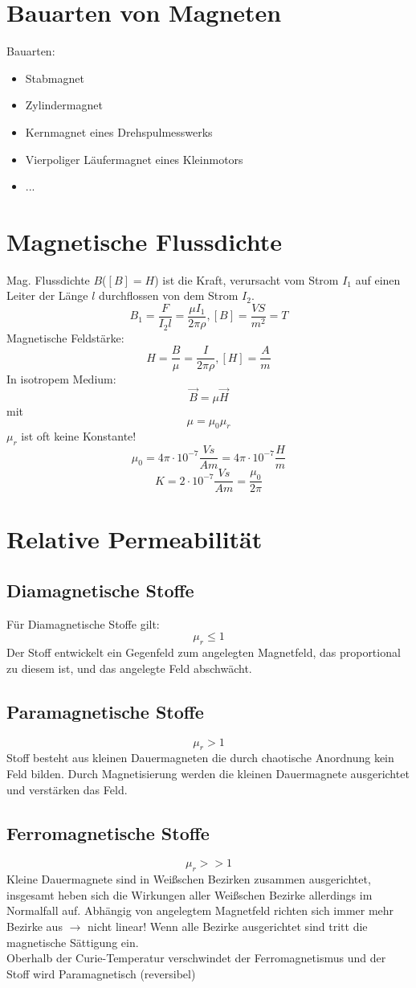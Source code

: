 \documentclass[12pt,a4paper]{article}
\begin{document}
\section{Bauarten von Magneten}
Bauarten:
\begin{itemize}
\item
Stabmagnet
\item
Zylindermagnet
\item
Kernmagnet eines Drehspulmesswerks
\item
Vierpoliger Läufermagnet eines Kleinmotors
\item
...
\end{itemize}


\section{Magnetische Flussdichte}
Mag. Flussdichte $B$($[B] = H$) ist die Kraft, verursacht vom Strom $I_1$ auf einen Leiter der Länge $l$ durchflossen von dem Strom $I_2$.
\[B_1 = \frac{F}{I_2 l} = \frac{\mu I_1}{2\pi \rho}, [B] = \frac{VS}{m^2} = T\]
Magnetische Feldstärke:
\[H = \frac{B}{\mu} = \frac{I}{2\pi \rho}, [H] = \frac{A}{m}\]
In isotropem Medium:
\[\vec{B} = \mu \vec{H}\]
mit
\[\mu = \mu_0 \mu_r\]
$\mu_r$ ist oft keine Konstante!
\[\mu_0 = 4\pi \cdot 10^{-7}\frac{Vs}{Am} = 4\pi \cdot 10^{-7}\frac{H}{m}\]
\[K = 2 \cdot 10^{-7} \frac{Vs}{Am} = \frac{\mu_0}{2\pi}\]

\section{Relative Permeabilität}
\subsection{Diamagnetische Stoffe}
Für Diamagnetische Stoffe gilt:
\[\mu_r \leq 1\]
Der Stoff entwickelt ein Gegenfeld zum angelegten Magnetfeld, das proportional zu diesem ist, und das angelegte Feld abschwächt.

\subsection{Paramagnetische Stoffe}
\[\mu_r > 1\]
Stoff besteht aus kleinen Dauermagneten die durch chaotische Anordnung kein Feld bilden. Durch Magnetisierung werden die kleinen Dauermagnete ausgerichtet und verstärken das Feld.

\subsection{Ferromagnetische Stoffe}
\[\mu_r >> 1\]
Kleine Dauermagnete sind in Weißschen Bezirken zusammen ausgerichtet, insgesamt heben sich die Wirkungen aller Weißschen Bezirke allerdings im Normalfall auf. Abhängig von angelegtem Magnetfeld richten sich immer mehr Bezirke aus $\rightarrow$ nicht linear! Wenn alle Bezirke ausgerichtet sind tritt die magnetische Sättigung ein.\\
Oberhalb der Curie-Temperatur verschwindet der Ferromagnetismus und der Stoff wird Paramagnetisch (reversibel)
\end{document}
